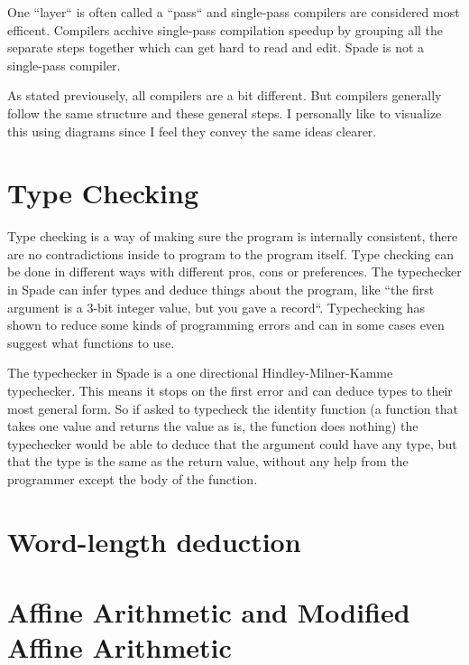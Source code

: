 \documentclass[msc,lith,english]{liuthesis}
\begin{document}
One ``layer`` is often called a ``pass`` and single-pass compilers are considered most efficent. Compilers acchive single-pass compilation speedup by grouping all the separate steps together which can get hard to read and edit. Spade is not a single-pass compiler.

\cite{src:DragonBook}\cite{src:LecturesOnCompilers}

As stated previousely, all compilers are a bit different. But compilers generally follow the same structure and these general steps. I personally like to visualize this using diagrams since I feel they convey the same ideas clearer.


\section{Type Checking} %
\label{sec:TypeChecking}
Type checking is a way of making sure the program is internally consistent, there are no contradictions inside to program to the program itself. Type checking can be done in different ways with different pros, cons or preferences. The typechecker in Spade can infer types and deduce things about the program, like ``the first argument is a 3-bit integer value, but you gave a record``. Typechecking has shown to reduce some kinds of programming errors and can in some cases even suggest what functions to use.

The typechecker in Spade is a one directional Hindley-Milner-Kamme typechecker. This means it stops on the first error and can deduce types to their most general form. So if asked to typecheck the identity function (a function that takes one value and returns the value as is, the function does nothing) the typechecker would be able to deduce that the argument could have any type, but that the type is the same as the return value, without any help from the programmer except the body of the function.

\cite{src:TypeCheckersBook}

\section{Word-length deduction}

\section{Affine Arithmetic and Modified Affine Arithmetic}
\label{sec:IAandAA}
\end{document}
